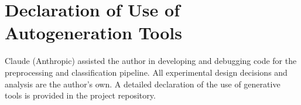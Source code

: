 \chapter{Declaration of Use of Autogeneration Tools}

Claude (Anthropic) assisted the author in developing and debugging code for the preprocessing and classification pipeline. All experimental design decisions and analysis are the author's own. A detailed declaration of the use of generative tools is provided in the project repository.

